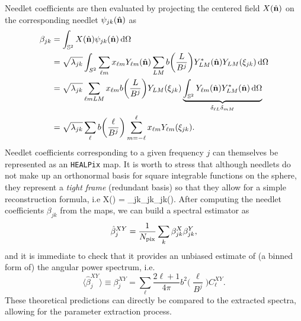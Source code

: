 %
Needlet coefficients are then evaluated by projecting the centered field $X(\hat{\mathbf{n}})$ on the corresponding needlet $\psi_{jk}(\hat{\mathbf{n}})$ as
%
\begin{equation}
\label{eqn:needcoef}
\begin{split}
\beta_{jk} &=\int_{\mathbb{S}^{2}} X(\nver) \psi_{jk}(\nver)\diff\Omega \\
&= \sqrt{\lambda_{jk}} \int_{S^2} \sum_{\ell m} x_{\ell m}Y_{\ell m}(\nver) \sum_{LM} b \biggl(\frac{L}{B^{j}} \biggr) Y^*_{LM}(\nver) Y_{LM}(\xi_{jk})\diff\Omega \\
&= \sqrt{\lambda_{jk}} \sum_{\ell m L M} x_{\ell m}  b \biggl(\frac{L}{B^{j}} \biggr) Y_{LM}(\xi_{jk}) \underbrace{\int_{\mathbb{S}^2}Y_{\ell m}(\nver)Y^*_{LM}(\nver) \diff\Omega}_{\delta_{\ell L}\delta_{mM}} \\
&= \sqrt{\lambda_{jk}} \sum_{\ell} b\biggl(\frac{\ell}{B^{j}}\biggr)\sum_{m=-\ell}^{\ell}x_{\ell m}Y_{\ell m}(\xi_{jk}).
\end{split}
\end{equation}
%
Needlet coefficients corresponding to a given frequency $j$ can themselves be represented as an 
\texttt{HEALPix} map. It is worth to stress that although needlets do not
make up an orthonormal basis for square integrable functions on the sphere, they represent a \textit{tight frame} (redundant basis) so that they allow for a
simple reconstruction formula, i.e
%
\be
X(\nver) = \sum_{jk}\beta_{jk}\psi_{jk}(\nver).
\ee
%
After computing the needlet coefficients $\beta_{jk}$ from the maps, we can build a spectral estimator as
%
\begin{equation}
\label{eqn:needest}
\hat{\beta}^{XY}_{j} = \frac{1}{N_{\rm{pix}}} \sum_k \beta^X_{jk}\beta^Y_{jk},
\end{equation}
%
and it is immediate to check that it provides an unbiased estimate of (a binned form of) the angular power spectrum, i.e.
%
\begin{equation}
\label{eqn:needestmean}
\langle \hat{\beta}^{XY}_{j} \rangle \equiv \beta^{XY}_{j} = \sum_{\ell} \frac{2\ell+1}{4\pi}  b^2 \biggl( \frac{\ell}{B^j} \biggr) C^{XY}_{\ell}.
\end{equation}
%
These theoretical predictions can directly be compared to the extracted spectra, allowing for the parameter extraction process.
